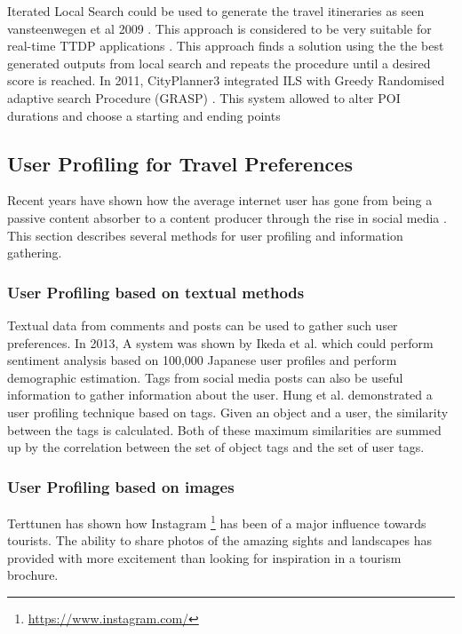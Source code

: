     Iterated Local Search could be used to generate the travel
    itineraries as seen vansteenwegen et al 2009
    \cite{Vansteenwegen2009}. This approach is considered to be very
    suitable for real-time TTDP applications \cite{Gavalas2015}. This
    approach finds a solution using the the best generated outputs
    from local search and repeats the procedure until a desired score
    is reached. In 2011, CityPlanner3 \cite{Vansteenwegen2011a}
    integrated ILS with Greedy Randomised adaptive search Procedure
    (GRASP) \cite{Feo1995}. This system allowed to alter POI durations
    and choose a starting and ending points

\subsection{User Profiling for Travel Preferences}
    Recent years have shown how the average internet user has gone
    from being a passive content absorber to a content producer
    through the rise in social media \cite{Ikeda}. This section
    describes several methods for user profiling and information
    gathering.\\

    \subsubsection{User Profiling based on textual methods} Textual
    data from comments and posts can be used to gather such user
    preferences. In 2013, A system was shown by Ikeda et al.
    \cite{Ikeda} which could perform sentiment analysis based on
    100,000 Japanese user profiles and perform demographic estimation.
    Tags from social media posts can also be useful information to
    gather information about the user. Hung et al. \cite{Hung2008}
    demonstrated a user profiling technique based on tags.  Given
    an object and a user, the similarity between the tags is
    calculated. Both of these maximum similarities are summed up by
    the correlation between the set of object tags and the set of user
    tags. \\

    \subsubsection{User Profiling based on images} Terttunen
    \cite{Terttunen2017} has shown how Instagram
    \footnote{\url{https://www.instagram.com/}} has been of a major
    influence towards tourists. The ability to share photos of the
    amazing sights and landscapes has provided with more excitement
    than looking for inspiration in a tourism brochure.

